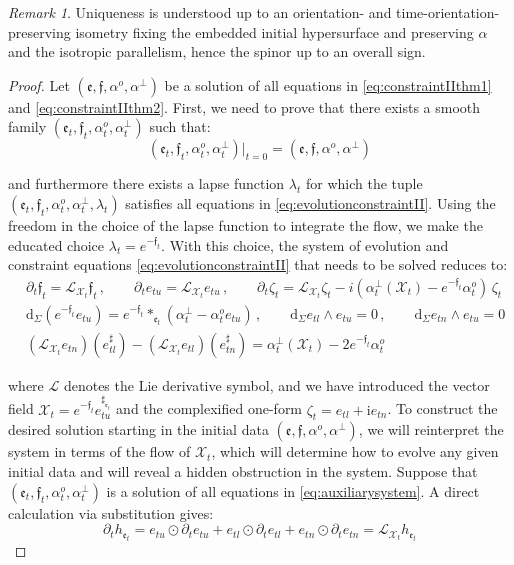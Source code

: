 \documentclass[10pt,reqno,a4paper]{amsart}
\theoremstyle{plain}
\theoremstyle{definition}
\theoremstyle{remark}
\newtheorem{remark}[thm]{Remark}
\theoremstyle{remark}
\def\dd{\mathrm{d}}
\def\cL{\mathcal{L}}
\def\cX{\mathcal{X}}
\def\cL{\mathcal{L}}
\def\fre{\mathfrak{e}}
\renewcommand{\(}{ (}
\renewcommand{\)}{ )}
\newcommand{\frf}{\mathfrak{f}}
\begin{document}
\begin{remark}
 Uniqueness is understood up to an orientation- and time-orientation-preserving isometry fixing the embedded initial hypersurface and preserving $\alpha$ and the isotropic parallelism, hence the spinor up to an overall sign.
\end{remark}

\begin{proof}
Let $(\fre,\frf,\alpha^o,\alpha^{\perp})$ be a solution of all equations in \eqref{eq:constraintIIthm1} and \eqref{eq:constraintIIthm2}. First, we need to prove that there exists a smooth family $(\fre_t,\frf_t,\alpha^o_t,\alpha^{\perp}_t)$ such that:
\begin{equation*}
(\fre_t,\frf_t,\alpha^o_t,\alpha^{\perp}_t) \vert_{t=0} = (\fre,\frf,\alpha^o,\alpha^{\perp})
\end{equation*}

\noindent
and furthermore there exists a lapse function $\lambda_t$ for which the tuple $(\fre_t,\frf_t,\alpha^o_t,\alpha^{\perp}_t, \lambda_t)$ satisfies all equations in \eqref{eq:evolutionconstraintII}. Using the freedom in the choice of the lapse function to integrate the flow, we make the educated choice $\lambda_t = e^{-\frf_t}$. With this choice, the system of evolution and constraint equations \eqref{eq:evolutionconstraintII} that needs to be solved reduces to: 
\begin{eqnarray}
 & \partial_t \frf_t =  \cL_{\cX_t}\frf_t \, , \qquad \partial_t e_{tu} = \mathcal{L}_{\cX_t} e_{tu}\, , \qquad  \partial_t \zeta_{t} = \mathcal{L}_{\cX_t} \zeta_t   - i (\alpha^{\perp}_t (\cX_t) - e^{-\frf_t}\alpha^o_t)\, \zeta_t   \nonumber \\ 
& \dd_{\Sigma} ( e^{-\frf_t} e_{tu}) = e^{-\frf_t} \ast_{\fre_t} (\alpha^{\perp}_t   - \alpha^o_t e_{tu})  \, , \qquad \dd_{\Sigma} e_{tl} \wedge e_{tu} = 0 \, , \qquad \dd_{\Sigma} e_{tn} \wedge e_{tu} = 0  \label{eq:auxiliarysystem} \\
& (\cL_{\cX_t}e_{tn})(e_{tl}^{\sharp}) - (\cL_{\cX_t}e_{tl})(e_{tn}^{\sharp}) = \alpha^{\perp}_t(\cX_t) - 2e^{-\frf_t} \alpha^o_t\nonumber
\end{eqnarray}

\noindent
where $\cL$ denotes the Lie derivative symbol, and we have introduced the vector field $\cX_t = e^{-\frf_t} e^{\sharp_{\fre_t}}_{tu}$ and the complexified one-form $\zeta_t = e_{tl} + \mathrm{i} e_{tn}$. To construct the desired solution starting in the initial data $(\fre,\frf,\alpha^o,\alpha^{\perp})$, we will reinterpret the system in terms of the flow of $\cX_t$, which will determine how to evolve any given initial data and will reveal a hidden obstruction in the system. Suppose that $(\fre_t,\frf_t,\alpha^o_t,\alpha^{\perp}_t)$ is a solution of all equations in \eqref{eq:auxiliarysystem}. A direct calculation via substitution gives:
\begin{equation*}
\partial_t h_{\fre_t} = e_{tu}\odot \partial_t e_{tu} + e_{tl}\odot \partial_t e_{tl} + e_{tn}\odot \partial_t e_{tn} = \cL_{\cX_t} h_{\fre_t}
\end{equation*}


\end{proof}
\end{document}
